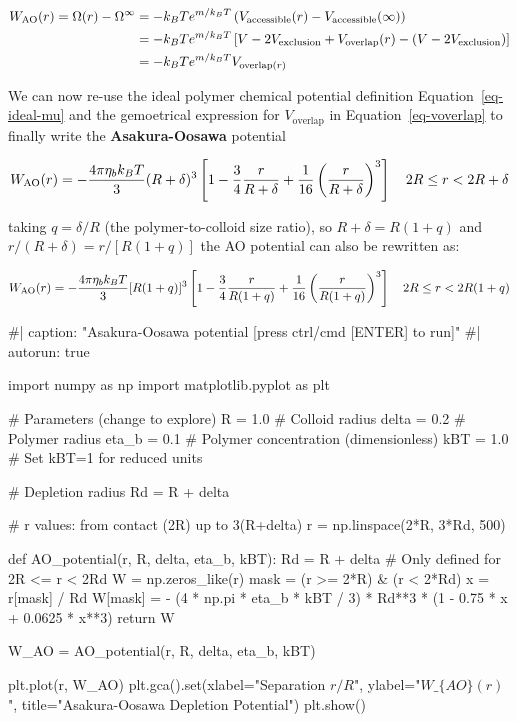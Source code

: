 \documentclass[
  letterpaper,
  enabledeprecatedfontcommands]{report}
\newenvironment{Shaded}{\begin{snugshade}}{\end{snugshade}}
\newcommand{\NormalTok}[1]{\textcolor[rgb]{0.00,0.23,0.31}{#1}}
\begin{document}
\[
\begin{aligned}
W_{\rm AO}(r) = \Omega(r)-\Omega^{\infty} & =-k_BT e^{m/k_B T}\left(V_{\rm accessible}(r)-V_{\rm accessible}(\infty)\right)\\
& = -k_BT e^{m/k_B T}\left[V-2V_{\rm exclusion}+V_{\mathrm{overlap}}(r)-(V-2V_{\rm exclusion})\right]\\
& = -k_BT e^{m/k_B T} V_{\mathrm{overlap}(r)}
\end{aligned}
\]

We can now re-use the ideal polymer chemical potential definition
Equation~\ref{eq-ideal-mu} and the gemoetrical expression for
\(V_{\mathrm{overlap}}\) in Equation~\ref{eq-voverlap} to finally write
the \textbf{Asakura-Oosawa} potential

\[
W_{\rm AO} (r) = - \dfrac{4 \pi \eta_b k_B T}{3} (R+\delta)^3\left[1-\dfrac{3}{4} \dfrac{r}{R+\delta}+\frac{1}{16}\left(\dfrac{r}{R+\delta}\right)^3\right] \quad 2R\leq r< 2R+\delta
\]

taking \(q = \delta / R\) (the polymer-to-colloid size ratio), so
\(R+\delta = R(1+q)\) and \(r/(R+\delta) = r/[R(1+q)]\) the AO potential
can also be rewritten as:

\[
W_{\rm AO}(r) = -\frac{4\pi \eta_b k_B T}{3} [R(1+q)]^3 \left[1 - \frac{3}{4} \frac{r}{R(1+q)} + \frac{1}{16} \left(\frac{r}{R(1+q)}\right)^3 \right] \quad 2R \leq r < 2R(1+q)
\]

\begin{Shaded}
\begin{Highlighting}[]
\NormalTok{\#| caption: "Asakura{-}Oosawa potential [press ctrl/cmd [ENTER] to run]"}
\NormalTok{\#| autorun: true}

\NormalTok{import numpy as np}
\NormalTok{import matplotlib.pyplot as plt}

\NormalTok{\# Parameters (change to explore)}
\NormalTok{R = 1.0           \# Colloid radius}
\NormalTok{delta = 0.2       \# Polymer radius}
\NormalTok{eta\_b = 0.1       \# Polymer concentration (dimensionless)}
\NormalTok{kBT = 1.0         \# Set kBT=1 for reduced units}

\NormalTok{\# Depletion radius}
\NormalTok{Rd = R + delta}

\NormalTok{\# r values: from contact (2R) up to 3(R+delta)}
\NormalTok{r = np.linspace(2*R, 3*Rd, 500)}

\NormalTok{def AO\_potential(r, R, delta, eta\_b, kBT):}
\NormalTok{    Rd = R + delta}
\NormalTok{    \# Only defined for 2R \textless{}= r \textless{} 2Rd}
\NormalTok{    W = np.zeros\_like(r)}
\NormalTok{    mask = (r \textgreater{}= 2*R) \& (r \textless{} 2*Rd)}
\NormalTok{    x = r[mask] / Rd}
\NormalTok{    W[mask] = {-} (4 * np.pi * eta\_b * kBT / 3) * Rd**3 * (1 {-} 0.75 * x + 0.0625 * x**3)}
\NormalTok{    return W}

\NormalTok{W\_AO = AO\_potential(r, R, delta, eta\_b, kBT)}

\NormalTok{plt.plot(r, W\_AO)}
\NormalTok{plt.gca().set(xlabel="Separation $r/R$", ylabel="$W\_\{AO\}(r)$", title="Asakura{-}Oosawa Depletion Potential")}
\NormalTok{plt.show()}
\end{Highlighting}
\end{Shaded}
\end{document}
